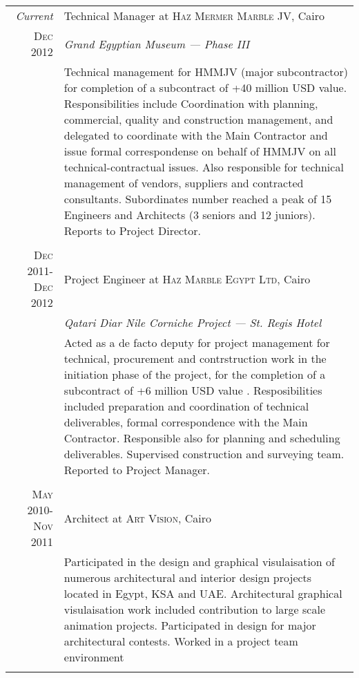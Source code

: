 \documentclass[a4paper,11pt]{article} %
\begin{document}
\begin{tabular}{r|p{11cm}}
\emph{Current} & Technical Manager at \textsc{Haz Mermer Marble JV}, Cairo\\
\textsc{Dec 2012} & \emph{Grand Egyptian Museum --- Phase III}\\ 
& \footnotesize{Technical management for HMMJV (major subcontractor) for completion of a subcontract of +40 million USD value. Responsibilities include Coordination with planning, commercial, quality and construction management, and delegated to coordinate with the Main Contractor and issue formal correspondense on behalf of HMMJV on all technical-contractual issues. Also responsible for technical management of vendors, suppliers and contracted consultants. Subordinates number reached a peak of 15 Engineers and Architects (3 seniors and 12 juniors). Reports to Project Director.}\\
\multicolumn{2}{c}{} \\


\textsc{Dec 2011-Dec 2012} & Project Engineer at \textsc{Haz Marble Egypt Ltd}, Cairo \\
& \emph{Qatari Diar Nile Corniche Project --- St. Regis Hotel} \\
& \footnotesize{Acted as a de facto deputy for project management for technical, procurement and contrstruction work in the initiation phase of the project, for the completion of a subcontract of +6 million USD value . Resposibilities included preparation and coordination of technical deliverables, formal correspondence with the Main Contractor. Responsible also for planning and scheduling deliverables. Supervised construction and surveying team. Reported to Project Manager.}\\
\multicolumn{2}{c}{} \\


\textsc{May 2010-Nov 2011} & Architect at \textsc{Art Vision}, Cairo \emph{}\\
& \footnotesize{Participated in the design and graphical visulaisation of numerous architectural and interior design projects located in Egypt, KSA and UAE. Architectural graphical visulaisation work included contribution to large scale animation projects. Participated in design for major architectural contests. Worked in a project team environment}\\
\multicolumn{2}{c}{} \\



\end{tabular}
\end{document}
